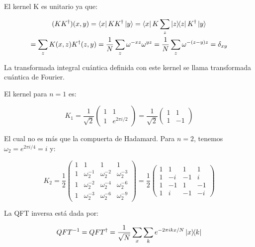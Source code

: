 El kernel K es unitario ya que:

\begin{multline}
    (K K^\dagger)(x,y) = \bra{x} K K^\dagger \ket{y}
    = \bra{x} K \sum\limits_z \ketbra{z}{z} K^\dagger \ket{y} \\
    = \sum\limits_z K(x,z) K^\dagger(z,y) 
    = \frac{1}{N} \sum\limits_z \omega^{-x z} \omega^{y z} 
    = \frac{1}{N} \sum\limits_z \omega^{- (z-y) z} 
    = \delta_{x y}
\end{multline}

La transformada integral cuántica definida con este kernel se llama transformada cuántica de Fourier.

El kernel para $n = 1$ es:

\begin{equation}
    K_1 = \frac{1}{\sqrt{2}}
    \begin{pmatrix}
        1 & 1 \\
        1 & e^{2\pi i/2}
    \end{pmatrix} =
    \frac{1}{\sqrt{2}}
    \begin{pmatrix}
        1 & 1 \\
        1 & -1
    \end{pmatrix}
\end{equation}

El cual no es más que la compuerta de Hadamard. Para $n = 2$, tenemos $\omega_2 = e^{2\pi i/4} = i$ y:

\begin{equation}
    K_2 = \frac{1}{2}
    \begin{pmatrix}
        1 & 1 & 1 & 1 \\
        1 & \omega_2^{-1} & \omega_2^{-2} & \omega_2^{-3} \\
        1 & \omega_2^{-2} & \omega_2^{-4} & \omega_2^{-6} \\
        1 & \omega_2^{-3} & \omega_2^{-6} & \omega_2^{-9}
    \end{pmatrix} =
    \frac{1}{2}
    \begin{pmatrix}
        1 & 1 & 1 & 1 \\
        1 & -i & -1 & i \\
        1 & -1 & 1 & -1 \\
        1 & i & -1 & -i
    \end{pmatrix}
\end{equation}

La QFT inversa está dada por:

\begin{equation}
    QFT^{-1} = QFT^\dagger = \frac{1}{\sqrt{N}} \sum\limits_x\sum\limits_k e^{- 2\pi i k x / N} \ketbra{x}{k}
\end{equation}

